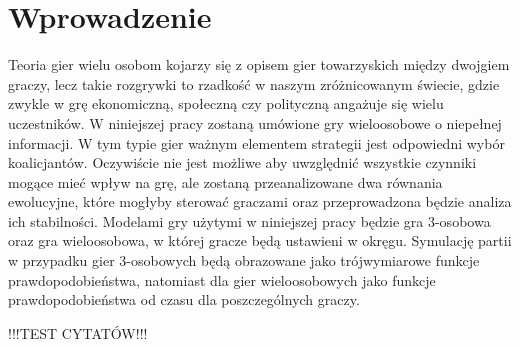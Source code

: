 \chapter{Wprowadzenie}
\label{cha:wprowadzenie}

Teoria gier wielu osobom kojarzy się z opisem gier towarzyskich między dwojgiem graczy, lecz takie rozgrywki to rzadkość w naszym zróżnicowanym świecie, gdzie zwykle w grę ekonomiczną, społeczną czy polityczną angażuje się wielu uczestników. 
W niniejszej pracy zostaną umówione gry wieloosobowe o niepełnej informacji. W tym typie gier ważnym elementem strategii jest odpowiedni wybór koalicjantów. Oczywiście nie jest możliwe aby uwzględnić wszystkie czynniki mogące mieć wpływ na grę, ale zostaną przeanalizowane dwa równania ewolucyjne, które mogłyby sterować graczami oraz przeprowadzona będzie analiza ich stabilności. Modelami gry użytymi w niniejszej pracy będzie gra 3-osobowa oraz gra wieloosobowa, w której gracze będą ustawieni w okręgu. Symulację partii w przypadku gier 3-osobowych będą obrazowane jako trójwymiarowe funkcje prawdopodobieństwa, natomiast dla gier wieloosobowych jako funkcje prawdopodobieństwa od czasu dla poszczególnych graczy.


!!!TEST CYTATÓW!!! \cite{Now06} \cite{Hof98} \cite{Str01} \cite{Qt} \cite{Tut} \cite{Sza} \cite{Fsmd}